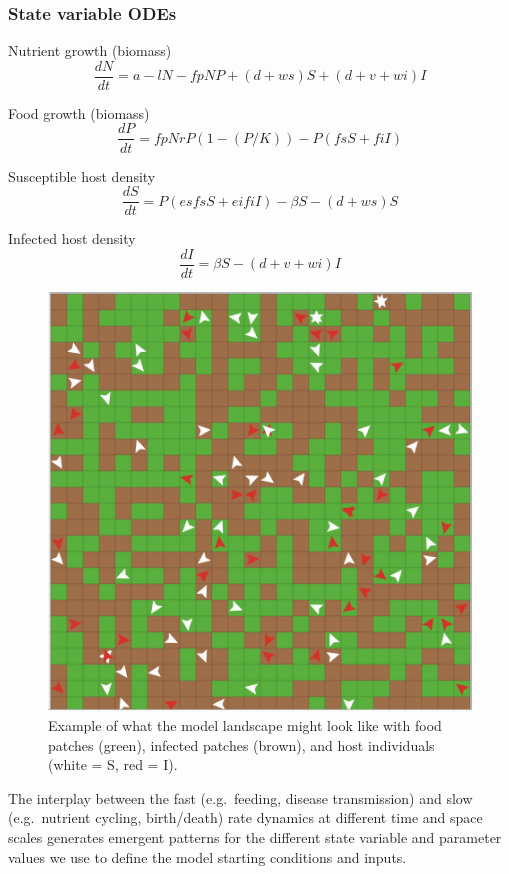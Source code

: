\documentclass[10,portrait]{article}
\begin{document}
\subsubsection{State variable ODEs}\label{state-variable-odes}

Nutrient growth (biomass)\\
\[
\frac
{dN}
{dt} = 
a - lN - fpNP + (d+ws)S + (d+v+wi)I  
\]

Food growth (biomass)\\
\[
\frac
{dP}
{dt} = 
fpNrP(1-(P/K)) - P(fsS+fiI) 
\]

Susceptible host density\\
\[
\frac
{dS}
{dt}
= P(esfsS + eifiI) - \beta S - (d+ws)S 
\]

Infected host density\\
\[
\frac
{dI}
{dt}
= \beta S - (d+v+wi)I 
\]

\begin{figure}
\centering
\includegraphics{landscape2.jpeg}
\caption{Example of what the model landscape might look like with food
patches (green), infected patches (brown), and host individuals (white =
S, red = I).}
\end{figure}

The interplay between the fast (e.g.~feeding, disease transmission) and
slow (e.g.~nutrient cycling, birth/death) rate dynamics at different
time and space scales generates emergent patterns for the different
state variable and parameter values we use to define the model starting
conditions and inputs.
\end{document}
